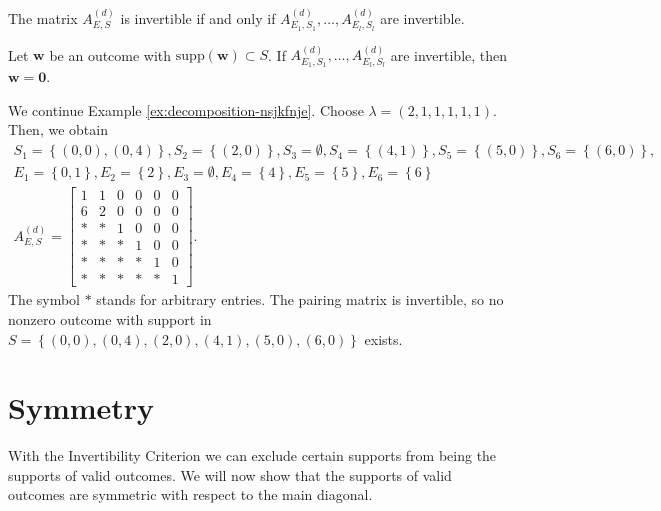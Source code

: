 \begin{corollary}
    The matrix \( A^{(d)}_{E,S} \) is invertible if and only if \( A^{(d)}_{E_1,S_1}, \dots,  A^{(d)}_{E_l,S_l} \) are invertible.
\end{corollary}

\begin{corollary}\label{cor:invertibility-criterion-nooos}
    Let \( \mathbf{w} \) be an outcome with \( \mathrm{supp}(\mathbf w) \subset S \).
    If \( A^{(d)}_{E_1,S_1}, \dots,  A^{(d)}_{E_l,S_l} \) are invertible, then \( \mathbf{w} = \mathbf 0 \).
\end{corollary}

\begin{example}
    We continue Example \ref{ex:decomposition-nsjkfnje}. Choose \( \lambda = (2,1,1,1,1,1) \). Then, we obtain 
    \begin{gather*}
        S_1 = \left\{ (0,0), (0,4) \right\}, S_2 = \left\{ (2,0) \right\}, S_3 = \emptyset, S_4 = \left\{ (4,1) \right\}, S_5 = \left\{ (5,0) \right\}, S_6 = \left\{ (6,0) \right\},\\
        E_1 = \left\{ 0, 1 \right\}, E_2 = \left\{ 2 \right\}, E_3 = \emptyset, E_4 = \left\{ 4 \right\}, E_5 = \left\{ 5 \right\}, E_6 = \left\{ 6 \right\}\\
        A^{(d)}_{E,S} = \begin{bmatrix}
            1 & 1 & 0 & 0 & 0 & 0 \\
            6 & 2 & 0 & 0 & 0 & 0 \\
            * & * & 1 & 0 & 0 & 0 \\
            * & * & * & 1 & 0 & 0 \\
            * & * & * & * & 1 & 0 \\
            * & * & * & * & * & 1
        \end{bmatrix}.
    \end{gather*}
    The symbol \( * \) stands for arbitrary entries. The pairing matrix is invertible, so no nonzero outcome with support in \( S = \left\{ (0,0), (0,4), (2,0), (4,1), (5,0), (6,0) \right\} \) exists.
\end{example}

\section{Symmetry}\label{sec:symmetry}

With the Invertibility Criterion we can exclude certain supports from being the supports of valid outcomes. We will now show that the supports of valid outcomes are symmetric with respect to the main diagonal.

